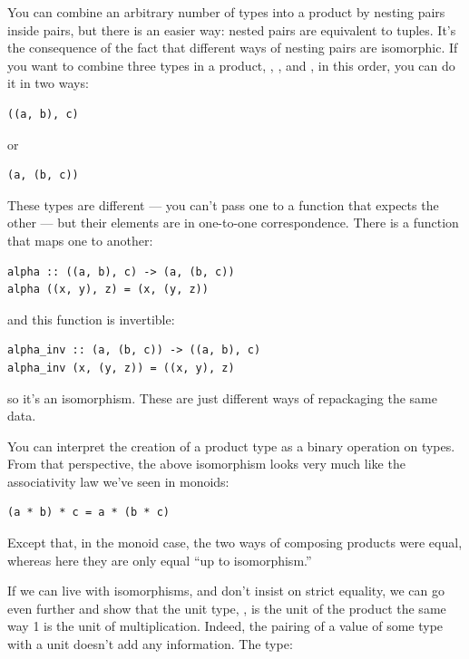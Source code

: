 You can combine an arbitrary number of types into a product by nesting
pairs inside pairs, but there is an easier way: nested pairs are
equivalent to tuples. It's the consequence of the fact that different
ways of nesting pairs are isomorphic. If you want to combine three types
in a product, , , and , in this order, you
can do it in two ways:

\begin{verbatim}
((a, b), c)
\end{verbatim}

\noindent
or

\begin{verbatim}
(a, (b, c))
\end{verbatim}

\noindent
These types are different --- you can't pass one to a function that
expects the other --- but their elements are in one-to-one
correspondence. There is a function that maps one to another:

\begin{verbatim}
alpha :: ((a, b), c) -> (a, (b, c))
alpha ((x, y), z) = (x, (y, z))
\end{verbatim}

\noindent
and this function is invertible:

\begin{verbatim}
alpha_inv :: (a, (b, c)) -> ((a, b), c)
alpha_inv (x, (y, z)) = ((x, y), z)
\end{verbatim}

\noindent
so it's an isomorphism. These are just different ways of repackaging the
same data.

You can interpret the creation of a product type as a binary operation
on types. From that perspective, the above isomorphism looks very much
like the associativity law we've seen in monoids:

\begin{verbatim}
(a * b) * c = a * (b * c)
\end{verbatim}

Except that, in the monoid case, the two ways of composing products were
equal, whereas here they are only equal ``up to isomorphism.''

If we can live with isomorphisms, and don't insist on strict equality,
we can go even further and show that the unit type, \code{()}, is the
unit of the product the same way 1 is the unit of multiplication.
Indeed, the pairing of a value of some type  with a unit
doesn't add any information. The type:

